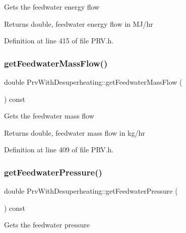 Gets the feedwater energy flow \begin{DoxyReturn}{Returns}
double, feedwater energy flow in M\+J/hr 
\end{DoxyReturn}


Definition at line 415 of file P\+R\+V.\+h.

\mbox{\label{class_prv_with_desuperheating_a9bd8ee7d5b563110a7279102352b8f4d}} 
\subsubsection{\texorpdfstring{get\+Feedwater\+Mass\+Flow()}{getFeedwaterMassFlow()}}
{\footnotesize\ttfamily double Prv\+With\+Desuperheating\+::get\+Feedwater\+Mass\+Flow (\begin{DoxyParamCaption}{ }\end{DoxyParamCaption}) const\hspace{0.3cm}{\ttfamily [inline]}}

Gets the feedwater mass flow \begin{DoxyReturn}{Returns}
double, feedwater mass flow in kg/hr 
\end{DoxyReturn}


Definition at line 409 of file P\+R\+V.\+h.

\mbox{\label{class_prv_with_desuperheating_a260bbe19272694af509fb408a821b041}} 
\subsubsection{\texorpdfstring{get\+Feedwater\+Pressure()}{getFeedwaterPressure()}}
{\footnotesize\ttfamily double Prv\+With\+Desuperheating\+::get\+Feedwater\+Pressure (\begin{DoxyParamCaption}{ }\end{DoxyParamCaption}) const\hspace{0.3cm}{\ttfamily [inline]}}

Gets the feedwater pressure

